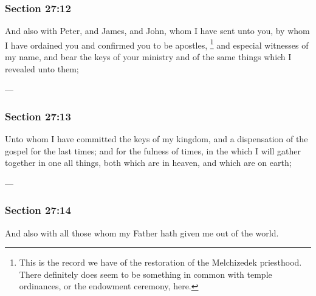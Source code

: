 	\subsubsection{Section 27:12} %
		\label{DC27-12}

		And also with Peter, and James, and John, whom I have sent unto you, by whom I have ordained you and confirmed you to be apostles,%
			\footnote{%
				This is the record we have of the restoration of the Melchizedek priesthood. There definitely does seem to be something in common with temple ordinances, or the endowment ceremony, here.
				}
		and especial witnesses of my name, and bear the keys of your ministry and of the same things which I revealed unto them;

		\begin{framed}
		\scriptsize
			\begin{compactdesc}
				\item[JSP] ---
			\end{compactdesc}
		\end{framed}

	\subsubsection{Section 27:13} %
		\label{DC27-13}

		Unto whom I have committed the keys of my kingdom, and a dispensation of the gospel for the last times; and for the fulness of times, in the which I will gather together in one all things, both which are in heaven, and which are on earth;

		\begin{framed}
		\scriptsize
			\begin{compactdesc}
				\item[JSP] ---
			\end{compactdesc}
		\end{framed}

	\subsubsection{Section 27:14} %
		\label{DC27-14}

		And also with all those whom my Father hath given me out of the world.

